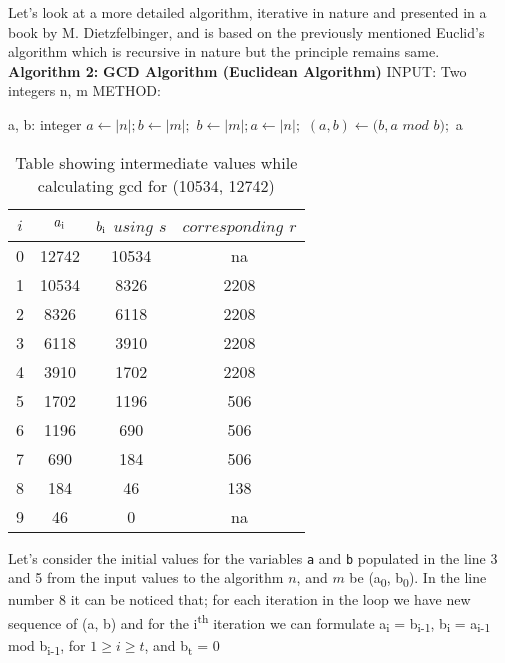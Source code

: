 \documentclass[12pt]{article}
\begin{document}
\begin{multicols}{2}
Let's look at a more detailed algorithm, iterative in nature and presented in a book by M. Dietzfelbinger, and is based on the previously mentioned Euclid's algorithm which is recursive in nature but the principle remains same.
\newline
\newline \textbf{Algorithm 2:}
\newline \textbf{GCD Algorithm (Euclidean Algorithm)}
\newline INPUT: Two integers n, m
\newline METHOD:


\begin{algorithmic}[1]
\STATE a, b: integer
	\STATE $a \gets |n|; b \gets |m|;$
\ELSE
	\STATE $b \gets |m|; a \gets |n|;$
\ENDIF
{} 
	\STATE $(a, b) \leftarrow (b, a  $ $mod $ $b);$
\ENDWHILE
\RETURN a
\end {algorithmic}

\begin{table*}[t]
\centering
	\begin{tabular}{c | c | c | c}
		\hline
		$i$ & $a\textsubscript{i}$ & $b\textsubscript{i} $ $using $ $s$ & $corresponding $ $r$\\ [0.5ex] 
		\hline
		0 & 12742 & 10534 & na  \\ 
		1 & 10534 & 8326  & 2208\\  
		2 & 8326  & 6118  & 2208\\
		3 & 6118  & 3910  & 2208\\
		4 & 3910   & 1702 & 2208\\
		5 & 1702   & 1196 & 506\\
		6 & 1196   & 690  & 506\\
		7 & 690    & 184  & 506\\
		8 & 184    & 46   & 138\\
		9 & 46     & 0    & na
	\end{tabular}
\caption{Table showing intermediate values while calculating gcd for (10534, 12742)}
\label{table:3}
\end{table*}

Let's consider the initial values for the variables \texttt{a} and \texttt{b} populated in the line 3 and 5 from the input values to the algorithm $n$, and $m$ be (a\textsubscript{0}, b\textsubscript{0}). In the line number 8 it can be noticed that; for each iteration in the loop we have new sequence of (a, b) and for the i\textsuperscript{th} iteration we can formulate a\textsubscript{i} = b\textsubscript{i-1}, b\textsubscript{i} = a\textsubscript{i-1} mod b\textsubscript{i-1}, for $1 \geq i \geq t$, and b\textsubscript{t} = 0


\end{multicols}
\end{document}
